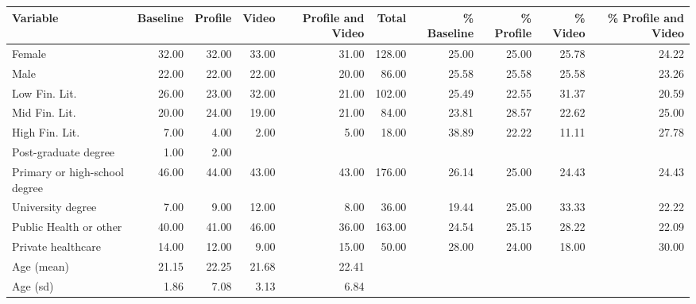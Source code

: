 \begin{tabular}{lrrrrrrrrr}
  \hline
Variable & Baseline & Profile & Video & Profile and Video & Total & \% Baseline & \% Profile & \% Video & \% Profile and Video \\ 
  \hline
Female & 32.00 & 32.00 & 33.00 & 31.00 & 128.00 & 25.00 & 25.00 & 25.78 & 24.22 \\ 
  Male & 22.00 & 22.00 & 22.00 & 20.00 & 86.00 & 25.58 & 25.58 & 25.58 & 23.26 \\ 
  Low Fin. Lit. & 26.00 & 23.00 & 32.00 & 21.00 & 102.00 & 25.49 & 22.55 & 31.37 & 20.59 \\ 
  Mid Fin. Lit. & 20.00 & 24.00 & 19.00 & 21.00 & 84.00 & 23.81 & 28.57 & 22.62 & 25.00 \\ 
  High Fin. Lit. & 7.00 & 4.00 & 2.00 & 5.00 & 18.00 & 38.89 & 22.22 & 11.11 & 27.78 \\ 
  Post-graduate degree & 1.00 & 2.00 &  &  &  &  &  &  &  \\ 
  Primary or high-school degree & 46.00 & 44.00 & 43.00 & 43.00 & 176.00 & 26.14 & 25.00 & 24.43 & 24.43 \\ 
  University degree & 7.00 & 9.00 & 12.00 & 8.00 & 36.00 & 19.44 & 25.00 & 33.33 & 22.22 \\ 
  Public Health or other & 40.00 & 41.00 & 46.00 & 36.00 & 163.00 & 24.54 & 25.15 & 28.22 & 22.09 \\ 
  Private healthcare & 14.00 & 12.00 & 9.00 & 15.00 & 50.00 & 28.00 & 24.00 & 18.00 & 30.00 \\ 
  Age (mean) & 21.15 & 22.25 & 21.68 & 22.41 &  &  &  &  &  \\ 
  Age (sd) & 1.86 & 7.08 & 3.13 & 6.84 &  &  &  &  &  \\ 
   \hline
\end{tabular}
